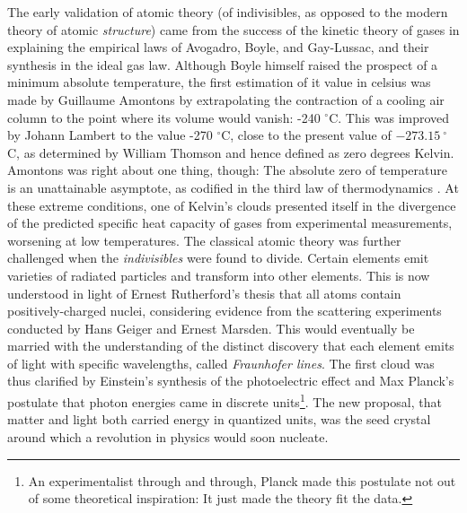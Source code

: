 	The early validation of atomic theory (of indivisibles, as opposed to the modern theory of atomic \emph{structure}) came from the success of the kinetic theory of gases in explaining the empirical laws of Avogadro, Boyle, and Gay-Lussac, and their synthesis in the ideal gas law. Although Boyle himself raised the prospect of a minimum absolute temperature, the first estimation of it value in celsius was made by Guillaume Amontons by extrapolating the contraction of a cooling air column to the point where its volume would vanish: -240 $^\circ$C. This was improved by Johann Lambert to the value -270 $^\circ$C, close to the present value of $-273.15~^\circ$C, as determined by William Thomson and hence defined as zero degrees Kelvin. Amontons was right about one thing, though: The absolute zero of temperature is an unattainable asymptote, as codified in the third law of thermodynamics \cite{Masanes17}. At these extreme conditions, one of Kelvin's clouds presented itself in the divergence of the predicted specific heat capacity of gases from experimental measurements, worsening at low temperatures. 
	The classical atomic theory was further challenged when the \emph{indivisibles} were found to divide. 
	Certain elements emit varieties of radiated particles and transform into other elements. 
	This is now understood in light of Ernest Rutherford's thesis that all atoms contain positively-charged nuclei, considering evidence from the scattering experiments conducted by Hans Geiger and Ernest Marsden. 
	This would eventually be married with the understanding of the distinct discovery that each element emits of light with specific wavelengths, called \emph{Fraunhofer lines}.
	The first cloud was thus clarified by Einstein's synthesis of the photoelectric effect and Max Planck's postulate that photon energies came in discrete units\footnote{An experimentalist through and through, Planck made this postulate not out of some theoretical inspiration: It just made the theory fit the data.}. 
	The new proposal, that matter and light both carried energy in quantized units, was the seed crystal around which a revolution in physics would soon nucleate.

